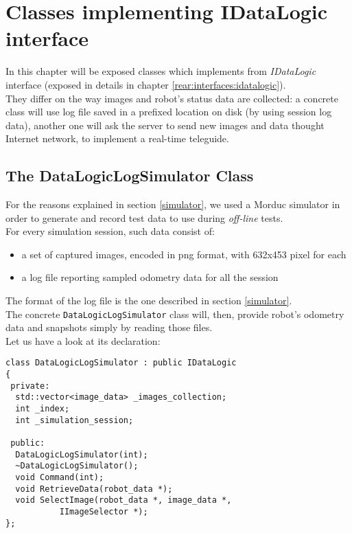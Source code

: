\section{Classes implementing IDataLogic interface}
\label{concr:idatalogic}

In this chapter will be exposed classes which implements
from \textit{IDataLogic} interface (exposed in details
in chapter \ref{rear:interfaces:idatalogic}).
\\
They differ on the way images
and robot's status data are collected: a concrete class
will use log file saved in a prefixed location on disk
(by using session log data),
another one will ask the server to send new images and data
thought Internet network, to implement a real-time teleguide.

\subsection{The DataLogicLogSimulator Class}
\label{concr:idatalogic:datalogiclogsimulator}

For the reasons explained in section \ref{simulator}, 
we used a Morduc simulator in order to generate and record 
test data to use during \textit{off-line} tests.
\\
For every simulation session, such data consist of:

\begin{itemize}
  \item a set of captured images, encoded in png format,
    with 632x453 pixel for each
  \item a log file reporting sampled odometry data
    for all the session
\end{itemize}

The format of the log file is the one described in section 
\ref{simulator}.
\\
The concrete \texttt{DataLogicLogSimulator} class will, then, provide 
robot's odometry data and snapshots simply by reading 
those files.
\\
Let us have a look at its declaration:

\begin{lstlisting}[caption={\texttt{DataLogic} declaration}, label={code:datalogic}, frame=trBL]
class DataLogicLogSimulator : public IDataLogic
{
 private:
  std::vector<image_data> _images_collection;
  int _index;
  int _simulation_session;
  
 public:
  DataLogicLogSimulator(int);
  ~DataLogicLogSimulator();
  void Command(int);
  void RetrieveData(robot_data *);
  void SelectImage(robot_data *, image_data *,
		   IImageSelector *);
};
\end{lstlisting}

